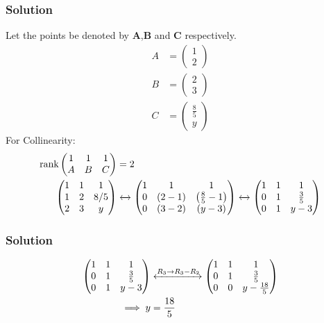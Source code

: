 \documentclass{beamer}
\begin{document}
\begin{frame}
\frametitle{Solution}
Let the points be denoted by $\textbf{A}$,$\textbf{B}$ and $\textbf{C}$ respectively.
\begin{align}
  A &= \begin{pmatrix}
        1\\
        2
    \end{pmatrix}  \\
    B &= \begin{pmatrix}
        2\\
        3
    \end{pmatrix}\\
  C &= \begin{pmatrix}
        \frac{8}{5}\\
        y
    \end{pmatrix}
    \end{align}
    For Collinearity:
    \begin{align}
          \text{rank}\begin{pmatrix}
        1 & 1 & 1\\
        A & B & C
    \end{pmatrix} &=2 \label{10}\\
    \begin{pmatrix}
        1 & 1 & 1\\
        1 & 2 & 8/5\\
        2 & 3 & y
    \end{pmatrix} &\xleftrightarrow{}
    \begin{pmatrix}
        1 & 1 & 1\\
        0 & \left(2-1\right) & \left(\frac{8}{5}-1\right)\\
        0 & \left(3-2\right) & \left(y-3\right)
    \end{pmatrix}\xleftrightarrow{}
    \begin{pmatrix}
        1 & 1 & 1\\
        0 & 1 & \frac{3}{5}\\
        0 & 1 & y-3
    \end{pmatrix}
\end{align}
\end{frame}




\begin{frame}
\frametitle{Solution}
\begin{align}
 \begin{pmatrix}
        1 & 1 & 1\\
        0 & 1 & \frac{3}{5}\\
        0 & 1 & y-3
    \end{pmatrix}
   & \xleftrightarrow{R_3\rightarrow R_3-R_2}
    \begin{pmatrix}
        1 & 1 & 1\\
        0 & 1 & \frac{3}{5}\\
        0 & 0 & y-\frac{18}{5}
    \end{pmatrix}\\
    \implies y &= \frac{18}{5}
\end{align}
\end{frame}
\end{document}
